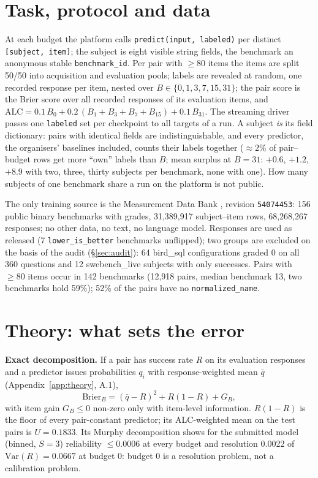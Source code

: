 \documentclass{article}
\begin{document}
\section{Task, protocol and data}
\label{sec:data}

At each budget the platform calls \texttt{predict(input, labeled)} per distinct \texttt{[subject, item]}; the subject
is eight visible string fields, the benchmark an anonymous stable \texttt{benchmark\_id}. Per pair with $\ge 80$ items
the items are split 50/50 into acquisition and evaluation pools; labels are revealed at random, one recorded response
per item, nested over $B \in \{0,1,3,7,15,31\}$; the pair score is the Brier score over all recorded responses of its
evaluation items, and $\mathrm{ALC} = 0.1\,B_0 + 0.2\,(B_1 + B_3 + B_7 + B_{15}) + 0.1\,B_{31}$. The streaming driver
\citep{paiecbase2026} passes one \texttt{labeled} set per checkpoint to all targets of a run. A subject \emph{is}
its field dictionary: pairs with identical fields are indistinguishable, and every predictor, the organisers' baselines
included, counts their labels together ($\approx 2\%$ of pair--budget rows get more ``own'' labels than $B$; mean surplus
at $B = 31$: $+0.6$, $+1.2$, $+8.9$ with two, three, thirty subjects per benchmark, none with one). How many subjects
of one benchmark share a run on the platform is not public.

The only training source is the Measurement Data Bank \citep{mdb2026}, revision \texttt{54074453}: 156 public binary
benchmarks with grades, 31,389,917 subject--item rows, 68,268,267 responses; no other data, no text, no language model.
Responses are used as released (7 \texttt{lower\_is\_better} benchmarks unflipped); two groups are excluded on the
basis of the audit (\S\ref{sec:audit}): 64 bird\_sql configurations graded 0 on all 360 questions and 12 swebench\_live
subjects with only successes. Pairs with $\ge 80$ items occur in 142 benchmarks (12,918 pairs, median benchmark 13, two
benchmarks hold 59\%); 52\% of the pairs have no \texttt{normalized\_name}.

\section{Theory: what sets the error}
\label{sec:theory}

\textbf{Exact decomposition.} If a pair has success rate $R$ on its evaluation responses and a predictor issues
probabilities $q_i$ with response-weighted mean $\bar q$ (Appendix~\ref{app:theory}, A.1),
\begin{equation}
  \mathrm{Brier}_B = (\bar q - R)^2 + R(1-R) + G_B,
  \label{eq:brier}
\end{equation}
with item gain $G_B \le 0$ non-zero only with item-level information. $R(1-R)$ is the floor of every pair-constant
predictor; its ALC-weighted mean on the test pairs is $U = 0.1833$. Its Murphy decomposition
\citep{murphy1973partition, gneiting2007proper} shows for the submitted model (binned, $S = 3$) reliability $\le 0.0006$
at every budget and resolution 0.0022 of $\mathrm{Var}(R) = 0.0667$ at budget 0: budget 0 is a resolution problem, not a
calibration problem.
\end{document}
